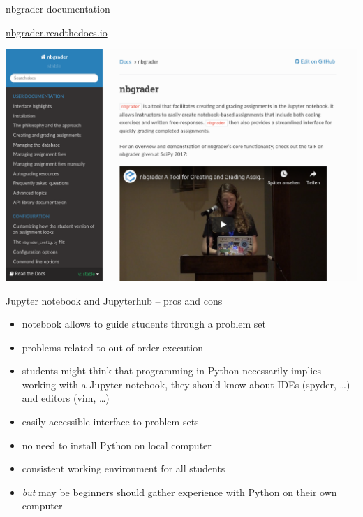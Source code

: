 \documentclass[svgnames]{beamer}
\newcommand\but{\alert{\textit{but}} }
\begin{document}
\begin{frame}{nbgrader documentation}
 \begin{center}
  \url{nbgrader.readthedocs.io}

  \vspace{0.3truecm}
  \includegraphics[width=\textwidth]{nbgrader_rtd}
 \end{center}
\end{frame}

\begin{frame}{Jupyter notebook and Jupyterhub -- pros and cons}

 \begin{itemize}
  \item notebook allows to guide students through a problem set
  \item problems related to out-of-order execution
  \item students might think that programming in Python
	necessarily implies working with a Jupyter notebook,
        they should know about IDEs (spyder, \dots) and
	editors (vim, \dots)
 \end{itemize}

 \begin{itemize}
  \item easily accessible interface to problem sets
  \item no need to install Python on local computer
  \item consistent working environment for all students
  \item \but may be beginners should gather experience with Python
	on their own computer
 \end{itemize}
\end{frame}
\end{document}
